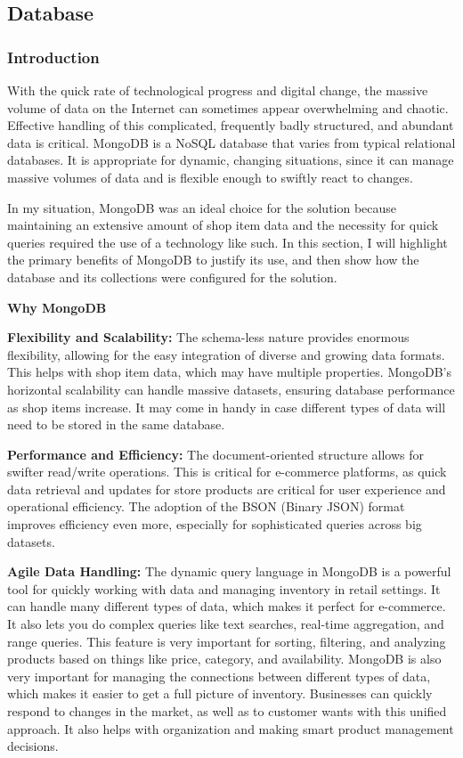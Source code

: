 \subsection{Database}

\subsubsection{Introduction}

With the quick rate of technological progress and digital change, the massive volume of data on the Internet can sometimes appear overwhelming and chaotic. Effective handling of this complicated, frequently badly structured, and abundant data is critical. MongoDB is a NoSQL database that varies from typical relational databases. It is appropriate for dynamic, changing situations, since it can manage massive volumes of data and is flexible enough to swiftly react to changes.

In my situation, MongoDB was an ideal choice for the solution because maintaining an extensive amount of shop item data and the necessity for quick queries required the use of a technology like such. In this section, I will highlight the primary benefits of MongoDB to justify its use, and then show how the database and its collections were configured for the solution.

\noindent\textbf{Why MongoDB} 

\textbf{Flexibility and Scalability:} The schema-less nature provides enormous flexibility, allowing for the easy integration of diverse and growing data formats. This helps with shop item data, which may have multiple properties. MongoDB's horizontal scalability can handle massive datasets, ensuring database performance as shop items increase. It may come in handy in case different types of data will need to be stored in the same database.

\textbf{Performance and Efficiency:} The document-oriented structure allows for swifter read/write operations. This is critical for e-commerce platforms, as quick data retrieval and updates for store products are critical for user experience and operational efficiency. The adoption of the BSON (Binary JSON) format improves efficiency even more, especially for sophisticated queries across big datasets.

\textbf{Agile Data Handling:} The dynamic query language in MongoDB is a powerful tool for quickly working with data and managing inventory in retail settings. It can handle many different types of data, which makes it perfect for e-commerce. It also lets you do complex queries like text searches, real-time aggregation, and range queries. This feature is very important for sorting, filtering, and analyzing products based on things like price, category, and availability. MongoDB is also very important for managing the connections between different types of data, which makes it easier to get a full picture of inventory. Businesses can quickly respond to changes in the market, as well as to customer wants with this unified approach. It also helps with organization and making smart product management decisions. 

